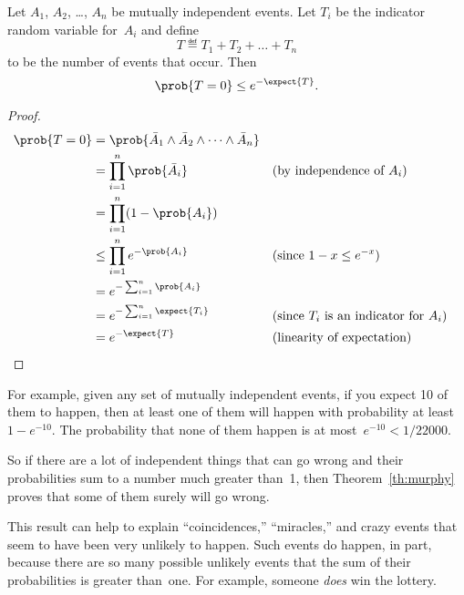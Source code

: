 
\begin{theorem}\label{th:murphy}
Let $A_1$, $A_2$, \dots, $A_n$ be mutually independent events.  Let
$T_i$ be the indicator random variable for~$A_i$ and define
\begin{equation*}
    T \eqdef T_1 + T_2 + \dots + T_n
\end{equation*}
to be the number of events that occur.  Then
\begin{equation*}
    \prob{T = 0} \le e^{- \expect{T}}.
\end{equation*}
\end{theorem}

\begin{proof}
\begin{align*}
\prob{T = 0}
    &= \prob{ \bar{A}_1 \land \bar{A}_2 \land \dots \land \bar{A}_n } \\
    &= \prod_{i = 1}^n \prob{\bar{A}_i}
        && \text{(by independence of $A_i$)} \\
    &= \prod_{i = 1}^n (1 - \prob{A_i}) \\
    &\le \prod_{i = 1}^n e^{-\prob{A_i}}
        && \text{(since $1 - x \le e^{-x}$)} \\
    &= e^{-\sum_{i = 1}^n \prob{A_i}} \\
    &= e^{-\sum_{i = 1}^n \expect{T_i}} 
        && \text{(since $T_i$ is an indicator for $A_i$)} \\
    &= e^{-\expect{T}}
        && \text{(linearity of expectation)}
        & \qedhere
\end{align*}
\end{proof}

For example, given any set of mutually independent events, if you
expect 10 of them to happen, then at least one of them will happen
with probability at least~$1 - e^{-10}$.  The probability that none of
them happen is at most~$e^{-10} < 1/22000$.

So if there are a lot of independent things that can go wrong and their
probabilities sum to a number much greater than~1, then
Theorem~\ref{th:murphy} proves that some of them surely will go wrong.

This result can help to explain ``coincidences,'' ``miracles,'' and
crazy events that seem to have been very unlikely to happen.  Such
events do happen, in part, because there are so many possible unlikely
events that the sum of their probabilities is greater than~one.  For
example, someone \emph{does} win the lottery.

